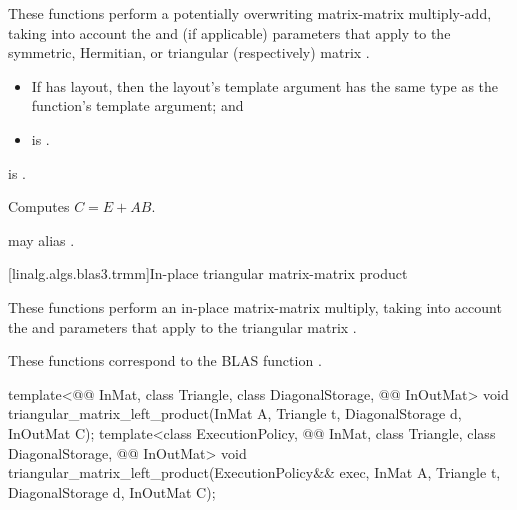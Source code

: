 \begin{itemdescr}
\pnum
These functions perform
a potentially overwriting matrix-matrix multiply-add,
taking into account
the  and  (if applicable) parameters
that apply to the symmetric, Hermitian, or triangular (respectively) matrix .

\pnum
\mandates
\begin{itemize}
\item
If  has  layout,
then the layout's  template argument has
the same type as the function's  template argument; and
\item
{} is .
\end{itemize}

\pnum
\expects
{} is .

\pnum
\effects
Computes $C = E + A B$.

\pnum
\remarks
{} may alias .
\end{itemdescr}

[linalg.algs.blas3.trmm]{In-place triangular matrix-matrix product}

\pnum
These functions perform
an in-place matrix-matrix multiply,
taking into account
the  and  parameters
that apply to the triangular matrix .
\begin{note}
These functions correspond to the BLAS function \supercite{blas3}.
\end{note}

%
\begin{itemdecl}
template<@@ InMat, class Triangle, class DiagonalStorage, @@ InOutMat>
  void triangular_matrix_left_product(InMat A, Triangle t, DiagonalStorage d, InOutMat C);
template<class ExecutionPolicy,
         @@ InMat, class Triangle, class DiagonalStorage, @@ InOutMat>
  void triangular_matrix_left_product(ExecutionPolicy&& exec,
                                      InMat A, Triangle t, DiagonalStorage d, InOutMat C);
\end{itemdecl}

